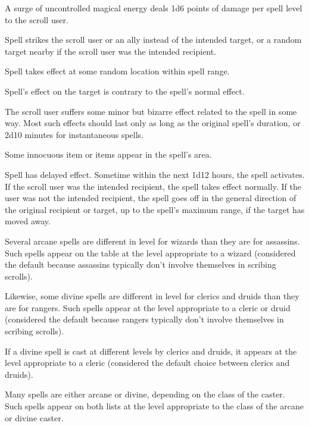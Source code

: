 \begin{itemize*}
\item A surge of uncontrolled magical energy deals 1d6 points of damage per spell level to the scroll user.
\item Spell strikes the scroll user or an ally instead of the intended target, or a random target nearby if the scroll user was the intended recipient.
\item Spell takes effect at some random location within spell range.
\item Spell's effect on the target is contrary to the spell's normal effect.
\item The scroll user suffers some minor but bizarre effect related to the spell in some way. Most such effects should last only as long as the original spell's duration, or 2d10 minutes for instantaneous spells.
\item Some innocuous item or items appear in the spell's area.
\item Spell has delayed effect. Sometime within the next 1d12 hours, the spell activates. If the scroll user was the intended recipient, the spell takes effect normally. If the user was not the intended recipient, the spell goes off in the general direction of the original recipient or target, up to the spell's maximum range, if the target has moved away.
\end{itemize*}

Several arcane spells are different in level for wizards than they are for assassins. Such spells appear on the table at the level appropriate to a wizard (considered the default because assassins typically don't involve themselves in scribing scrolls).

Likewise, some divine spells are different in level for clerics and druids than they are for rangers. Such spells appear at the level appropriate to a cleric or druid (considered the default because rangers typically don't involve themselves in scribing scrolls).

If a divine spell is cast at different levels by clerics and druids, it appears at the level appropriate to a cleric (considered the default choice between clerics and druids).

Many spells are either arcane or divine, depending on the class of the caster. Such spells appear on both lists at the level appropriate to the class of the arcane or divine caster. 